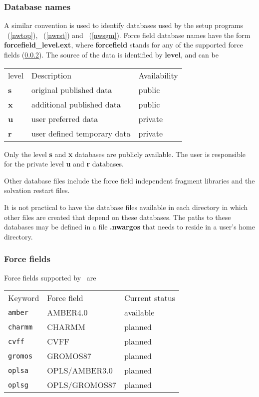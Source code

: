 \subsubsection{Database names}
\par
A similar convention is used to identify databases used by the setup programs
\nwtop\ (\ref{nwtop}), \nwrst\ (\ref{nwrst}) and \nwsgm\ (\ref{nwsgm}).
Force field database names have the form
{\bf forcefield\_level.ext}, where {\bf forcefield} stands for any of the
supported force fields (\ref{forcefields}). The source
of the data is identified by {\bf level}, and can be 
\begin{center}
\begin{tabular}{lll}
\hline
level   & Description                 & Availability \\
{\bf s} & original published data     & public       \\
{\bf x} & additional published data   & public       \\
{\bf u} & user preferred data         & private      \\
{\bf r} & user defined temporary data & private    \\
\hline
\end{tabular}
\end{center}
\par
Only the level {\bf s} and {\bf x} databases are publicly available. 
The user is responsible for the private level {\bf u} and {\bf r} databases.
\par
Other database files include the force field independent fragment libraries 
and the solvation restart files.
\par
It is not practical to have the database files available in each directory
in which other files are created that depend on these databases. The paths
to these databases may be defined in a file {\bf .nwargos} that needs to
reside in a user's home directory.
\subsubsection{Force fields}
\label{forcefields}
Force fields supported by \nwargos\ are
\begin{center}
\begin{tabular}{lll}
\hline
Keyword      & Force field   & Current status \\
{\tt amber}  & AMBER4.0      & available      \\
{\tt charmm} & CHARMM        & planned        \\
{\tt cvff}   & CVFF          & planned        \\
{\tt gromos} & GROMOS87      & planned        \\
{\tt oplsa}  & OPLS/AMBER3.0 & planned        \\
{\tt oplsg}  & OPLS/GROMOS87 & planned        \\
\hline
\end{tabular}
\end{center}  
